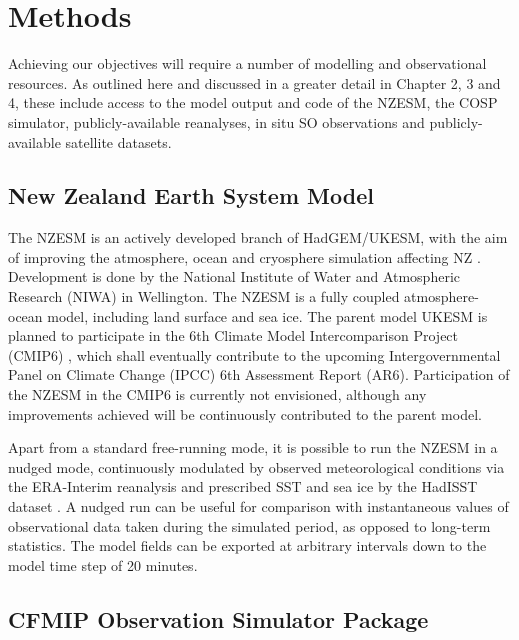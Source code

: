 \section{Methods}

Achieving our objectives will require a number of modelling and
observational resources. As outlined here and discussed in
a greater detail in Chapter 2, 3 and 4, these include access to the model output
and
code of the NZESM, the COSP simulator, publicly-available reanalyses,
 in situ SO observations and publicly-available
satellite datasets.

\subsection{New Zealand Earth System Model}

The NZESM is an actively developed branch of HadGEM/UKESM, with the
aim of improving the atmosphere, ocean and cryosphere simulation affecting NZ
\citep{williams2016}. Development is done by the National Institute of Water and
Atmospheric Research (NIWA) in Wellington.
The NZESM is a fully coupled atmosphere-ocean model, including land surface
and sea ice. The parent model UKESM \citep{walters2017} is planned to participate
in the 6th Climate Model Intercomparison Project (CMIP6) \citep{eyring2016,meehl2014},
which shall eventually contribute to the upcoming
Intergovernmental Panel on Climate Change (IPCC) 6th
Assessment Report (AR6). Participation of the NZESM in the CMIP6 is currently not
envisioned, although any improvements achieved will be continuously contributed
to the parent model.

Apart from a standard free-running mode, it is possible to run the NZESM
in a nudged mode, continuously modulated by observed meteorological
conditions via the ERA-Interim reanalysis \citep{dee2011} and prescribed SST and sea ice
by the HadISST dataset \citep{rayner2003}.
A nudged run can be useful for comparison with instantaneous values of
observational data taken during the simulated period,
as opposed to long-term statistics. The model fields can be exported
at arbitrary intervals down to the model time step of 20 minutes.

\subsection{CFMIP Observation Simulator Package}


